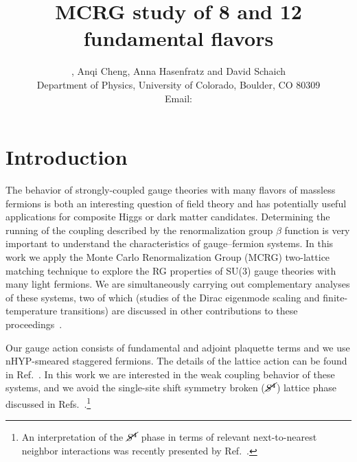 \documentclass{PoS}
\title{MCRG study of 8 and 12 fundamental flavors}
\author{\speaker{Gregory Petropoulos}, Anqi Cheng, Anna Hasenfratz and David Schaich \\
  Department of Physics, University of Colorado, Boulder, CO 80309 \\
  Email: \email{gregory.petropoulos@colorado.edu}
}
\newcommand{\Sb}{\ensuremath{\cancel{S^4}} }
\newcommand{\refcite}[1]{Ref.~\cite{#1}}
\begin{document}
\section{Introduction}
The behavior of strongly-coupled gauge theories with many flavors of massless fermions is both an interesting question of field theory and has potentially useful applications for composite Higgs or dark matter candidates.
Determining the running of the coupling described by the renormalization group $\beta$ function is very important to understand the characteristics of gauge--fermion systems.
In this work we apply the Monte Carlo Renormalization Group (MCRG) two-lattice matching technique to explore the RG properties of SU(3) gauge theories with many light fermions.
We are simultaneously carrying out complementary analyses of these systems, two of which (studies of the Dirac eigenmode scaling and finite-temperature transitions) are discussed in other contributions to these proceedings~\cite{Hasenfratz:2012fp, Schaich:2012fr}.

Our gauge action consists of fundamental and adjoint plaquette terms and we use nHYP-smeared staggered fermions.
The details of the lattice action can be found in \refcite{Hasenfratz:2011xn}.
In this work we are interested in the weak coupling behavior of these systems, and we avoid the single-site shift symmetry broken ($\Sb$) lattice phase discussed in Refs.~\cite{Cheng:2011ic, Schaich:2012fr}.\footnote{An interpretation of the \Sb phase in terms of relevant next-to-nearest neighbor interactions was recently presented by \refcite{Deuzeman:2012ee}.}
\end{document}
